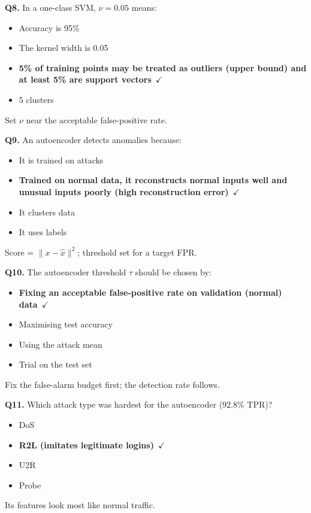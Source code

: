 \documentclass[11pt]{article}
\begin{document}
{\noindent\textbf{Q8.} In a one-class SVM, $\nu=0.05$ means:\begin{itemize}[leftmargin=2.2em,itemsep=0pt,topsep=1pt]\item[A.] Accuracy is 95\%\item[B.] The kernel width is 0.05\item[\textbf{C.}] \textbf{5\% of training points may be treated as outliers (upper bound) and at least 5\% are support vectors}~{\color{GrnN}$\checkmark$}\item[D.] 5 clusters\end{itemize} Set $\nu$ near the acceptable false-positive rate.\par\medskip

\noindent\textbf{Q9.} An autoencoder detects anomalies because:\begin{itemize}[leftmargin=2.2em,itemsep=0pt,topsep=1pt]\item[A.] It is trained on attacks\item[\textbf{B.}] \textbf{Trained on normal data, it reconstructs normal inputs well and unusual inputs poorly (high reconstruction error)}~{\color{GrnN}$\checkmark$}\item[C.] It clusters data\item[D.] It uses labels\end{itemize} Score = $\|x-\hat x\|^2$; threshold set for a target FPR.\par\medskip

\noindent\textbf{Q10.} The autoencoder threshold $\tau$ should be chosen by:\begin{itemize}[leftmargin=2.2em,itemsep=0pt,topsep=1pt]\item[\textbf{A.}] \textbf{Fixing an acceptable false-positive rate on validation (normal) data}~{\color{GrnN}$\checkmark$}\item[B.] Maximising test accuracy\item[C.] Using the attack mean\item[D.] Trial on the test set\end{itemize} Fix the false-alarm budget first; the detection rate follows.\par\medskip

\noindent\textbf{Q11.} Which attack type was hardest for the autoencoder (92.8\% TPR)?\begin{itemize}[leftmargin=2.2em,itemsep=0pt,topsep=1pt]\item[A.] DoS\item[\textbf{B.}] \textbf{R2L (imitates legitimate logins)}~{\color{GrnN}$\checkmark$}\item[C.] U2R\item[D.] Probe\end{itemize} Its features look most like normal traffic.\par\medskip

}
\end{document}
